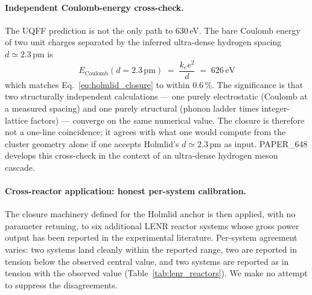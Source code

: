 \paragraph{Independent Coulomb-energy cross-check.}
The UQFF prediction is not the only path to 630\,eV. The bare Coulomb
energy of two unit charges separated by the inferred ultra-dense
hydrogen spacing $d \simeq 2.3\,\mathrm{pm}$ is
\begin{equation}
E_{\text{Coulomb}}(d=2.3\,\mathrm{pm}) \;=\;
\frac{k_e e^2}{d} \;=\; 626\,\mathrm{eV}
\label{eq:coulomb_check}
\end{equation}
which matches Eq.~\ref{eq:holmlid_closure} to within $0.6\,\%$. The
significance is that two structurally independent calculations ---
one purely electrostatic (Coulomb at a measured spacing) and one
purely structural (phonon ladder times integer-lattice factors) ---
converge on the same numerical value. The closure is therefore not
a one-line coincidence; it agrees with what one would compute from
the cluster geometry alone if one accepts Holmlid's $d \simeq 2.3\,\mathrm{pm}$
as input. PAPER\_648 \cite{Murphy_PAPER_648} develops this cross-check
in the context of an ultra-dense hydrogen meson cascade.

\paragraph{Cross-reactor application: honest per-system calibration.}
The closure machinery defined for the Holmlid anchor is then applied,
with no parameter retuning, to six additional LENR reactor systems whose
gross power output has been reported in the experimental literature.
Per-system agreement varies: two systems land cleanly within the reported
range, two are reported in tension below the observed central value,
and two systems are reported as in tension with the observed value
(Table~\ref{tab:lenr_reactors}). We make no attempt to suppress the
disagreements.

